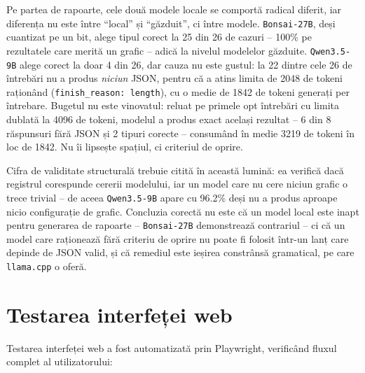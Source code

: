 \documentclass[12pt, a4paper]{report}
\newcommand{\code}[1]{\texttt{#1}}
\begin{document}
Pe partea de rapoarte, cele două modele locale se comportă radical diferit, iar
diferența nu este între ``local'' și ``găzduit'', ci între modele.
\code{Bonsai-27B}, deși cuantizat pe un bit, alege tipul corect la 25 din 26 de
cazuri -- 100\% pe rezultatele care merită un grafic -- adică la nivelul
modelelor găzduite. \code{Qwen3.5-9B} alege corect la doar 4 din 26, dar cauza
nu este gustul: la 22 dintre cele 26 de întrebări nu a produs \emph{niciun}
JSON, pentru că a atins limita de 2048 de tokeni raționând
(\code{finish\_reason: length}), cu o medie de 1842 de tokeni generați per
întrebare. Bugetul nu este vinovatul: reluat pe primele opt întrebări cu limita
dublată la 4096 de tokeni, modelul a produs exact același rezultat -- 6 din 8
răspunsuri fără JSON și 2 tipuri corecte -- consumând în medie 3219 de tokeni în
loc de 1842. Nu îi lipsește spațiul, ci criteriul de oprire.

Cifra de validitate structurală trebuie citită în această lumină: ea verifică
dacă registrul corespunde cererii modelului, iar un model care nu cere niciun
grafic o trece trivial -- de aceea \code{Qwen3.5-9B} apare cu 96.2\% deși nu a
produs aproape nicio configurație de grafic. Concluzia corectă nu este că un
model local este inapt pentru generarea de rapoarte -- \code{Bonsai-27B}
demonstrează contrariul -- ci că un model care raționează fără criteriu de
oprire nu poate fi folosit într-un lanț care depinde de JSON valid, și că
remediul este ieșirea constrânsă gramatical, pe care \code{llama.cpp} o oferă.

\section{Testarea interfeței web}

Testarea interfeței web a fost automatizată prin Playwright, verificând fluxul complet al utilizatorului:
\end{document}
